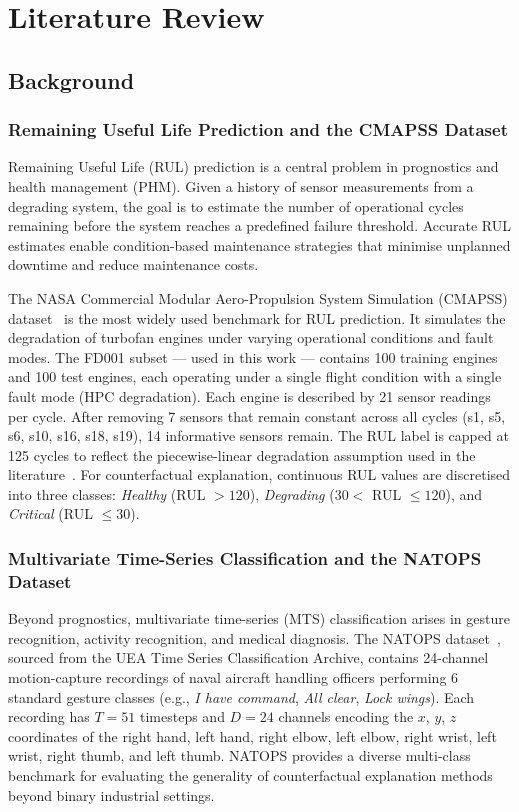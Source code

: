 \chapter{Literature Review}

\section{Background}

\subsection{Remaining Useful Life Prediction and the CMAPSS Dataset}

Remaining Useful Life (RUL) prediction is a central problem in prognostics and health management (PHM). Given a history of sensor measurements from a degrading system, the goal is to estimate the number of operational cycles remaining before the system reaches a predefined failure threshold. Accurate RUL estimates enable condition-based maintenance strategies that minimise unplanned downtime and reduce maintenance costs.

The NASA Commercial Modular Aero-Propulsion System Simulation (CMAPSS) dataset~\cite{saxena2008damage} is the most widely used benchmark for RUL prediction. It simulates the degradation of turbofan engines under varying operational conditions and fault modes. The FD001 subset — used in this work — contains 100 training engines and 100 test engines, each operating under a single flight condition with a single fault mode (HPC degradation). Each engine is described by 21 sensor readings per cycle. After removing 7 sensors that remain constant across all cycles (s1, s5, s6, s10, s16, s18, s19), 14 informative sensors remain. The RUL label is capped at 125 cycles to reflect the piecewise-linear degradation assumption used in the literature~\cite{heimes2008recurrent}. For counterfactual explanation, continuous RUL values are discretised into three classes: \textit{Healthy} (RUL $> 120$), \textit{Degrading} ($30 <$ RUL $\leq 120$), and \textit{Critical} (RUL $\leq 30$).

\subsection{Multivariate Time-Series Classification and the NATOPS Dataset}

Beyond prognostics, multivariate time-series (MTS) classification arises in gesture recognition, activity recognition, and medical diagnosis. The NATOPS dataset~\cite{zhang2011extracting}, sourced from the UEA Time Series Classification Archive, contains 24-channel motion-capture recordings of naval aircraft handling officers performing 6 standard gesture classes (e.g., \textit{I have command}, \textit{All clear}, \textit{Lock wings}). Each recording has $T = 51$ timesteps and $D = 24$ channels encoding the $x$, $y$, $z$ coordinates of the right hand, left hand, right elbow, left elbow, right wrist, left wrist, right thumb, and left thumb. NATOPS provides a diverse multi-class benchmark for evaluating the generality of counterfactual explanation methods beyond binary industrial settings.

